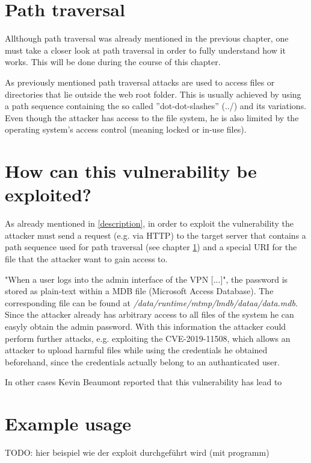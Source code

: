 \section{Path traversal}
\label{path-traversal}
Allthough path traversal was already mentioned in the previous chapter, one must take a closer look at path traversal in order to fully understand how it works. This will be done during the course of this chapter.

As previously mentioned path traversal attacks are used to access files or directories that lie outside the web root folder. This is usually achieved by using a path sequence containing the so called ''dot-dot-slashes'' (../) and its variations. Even though the attacker has access to the file system, he is also limited by the operating system's access control (meaning locked or in-use files).\autocite{OWASP-PathTraversal:online}

\section{How can this vulnerability be exploited?}
\label{sec:exploitation}
As already mentioned in \ref{description}, in order to exploit the vulnerability the attacker must send a request (e.g. via HTTP) to the target server that contains a path sequence used for path traversal (see chapter \ref{path-traversal}) and a special URI for the file that the attacker want to gain access to.\autocite{Tenable2:online}

"When a user logs into the admin interface of the VPN [...]"\autocite{Tenable2:online}, the password is stored as plain-text within a MDB file (Microsoft Access Database). The corresponding file can be found at \textit{/data/runtime/mtmp/lmdb/dataa/data.mdb}. Since the attacker already has arbitrary access to all files of the system he can easyly obtain the admin password. With this information the attacker could perform further attacks, e.g. exploiting the CVE-2019-11508, which allows an attacker to upload harmful files while using the credentials he obtained beforehand, since the credentials actually belong to an authanticated user.\autocite{Tenable2:online}

In other cases Kevin Beaumont reported that this vulnerability has lead to 

\section{Example usage}
\label{example}
TODO: hier beispiel wie der exploit durchgeführt wird (mit programm)


